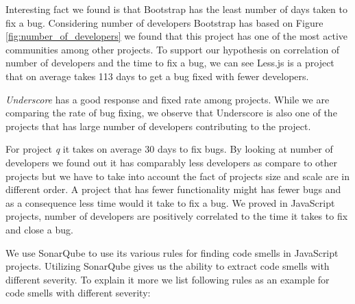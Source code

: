 \par 
Interesting fact we found is that Bootstrap has the least number of days taken to fix a bug. Considering number of developers Bootstrap has based on Figure \ref{fig:number_of_developers} we found that this project has one of the most active communities among other projects. To support our hypothesis on correlation of number of developers and the time to fix a bug, we can see Less.js is a project that on average takes 113 days to get a bug fixed with fewer developers. 
\par
\textit{Underscore} has a good response and fixed rate among projects. While we are comparing the rate of bug fixing, we observe that Underscore is also one of the projects that has large number of developers contributing to the project. 

\par For project \textit{q} it takes on average 30 days to fix bugs. By looking at number of developers we found out it has comparably less developers as compare to other projects but we have to take into account the fact of projects size and scale are in different order. A project that has fewer functionality might has fewer bugs and as a consequence less time would it take to fix a bug. We proved in JavaScript projects, number of developers are positively correlated to the time it takes to fix and close a bug.

\vspace{3 mm}
\noindent{\rqiv}
\vspace{3 mm}

We use SonarQube to use its various rules for finding code smells in JavaScript projects. Utilizing SonarQube gives us the ability to extract code smells with different severity. To explain it more we list following rules as an example for code smells with different severity:

